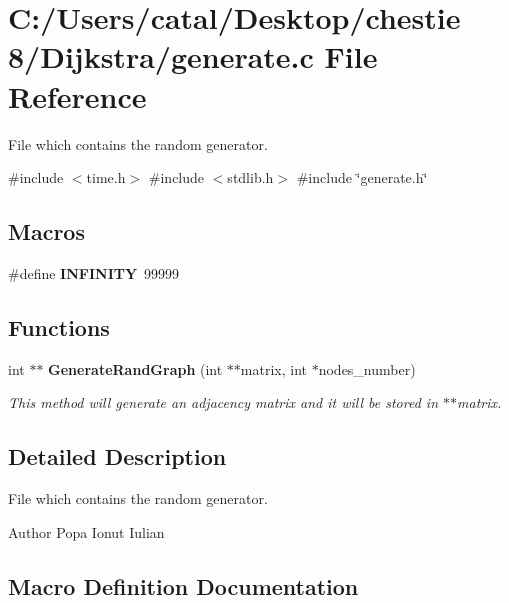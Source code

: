 \section{C\+:/\+Users/catal/\+Desktop/chestie 8/\+Dijkstra/generate.c File Reference}
\label{generate_8c}


File which contains the random generator.  


{\ttfamily \#include $<$time.\+h$>$}\newline
{\ttfamily \#include $<$stdlib.\+h$>$}\newline
{\ttfamily \#include \char`\"{}generate.\+h\char`\"{}}\newline
\subsection*{Macros}
\begin{DoxyCompactItemize}
\item 
\#define \textbf{ I\+N\+F\+I\+N\+I\+TY}~99999
\end{DoxyCompactItemize}
\subsection*{Functions}
\begin{DoxyCompactItemize}
\item 
int $\ast$$\ast$ \textbf{ Generate\+Rand\+Graph} (int $\ast$$\ast$matrix, int $\ast$nodes\+\_\+number)
\begin{DoxyCompactList}\small\item\em This method will generate an adjacency matrix and it will be stored in $\ast$$\ast$matrix. \end{DoxyCompactList}\end{DoxyCompactItemize}


\subsection{Detailed Description}
File which contains the random generator. 

\begin{DoxyAuthor}{Author}
Popa Ionut Iulian 
\end{DoxyAuthor}


\subsection{Macro Definition Documentation}
\mbox{\label{generate_8c_a956e2723d559858d08644ac99146e910}} 
